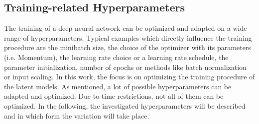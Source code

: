 \documentclass[12pt,DIV14,BCOR12mm,a4paper,footexclude,headinclude,halfparskip-,twoside,openright,cleardoubleempty,idxtotoc,bibtotoc,listtotoc,abstracton]{scrreprt} %
\numberwithin{equation}{chapter}
\begin{document}
\subsection{Training-related Hyperparameters}\label{subsec:Training-related Hyperparameters}
The training of a deep neural network can be optimized and adapted on a wide range of hyperparameters. Typical examples which directly influence the training procedure are the minibatch size, the choice of the optimizer with its parameters (i.e. Momentum), the learning rate choice or a learning rate schedule, the parameter initialization, number of epochs or methods like batch normalization or input scaling. In this work, the focus is on optimizing the training procedure of the latent models. As mentioned, a lot of possible hyperparameters can be adapted and optimized. Due to time restrictions, not all of them can be optimized. In the following, the investigated hyperparameters will be described and in which form the variation will take place.
\end{document}
